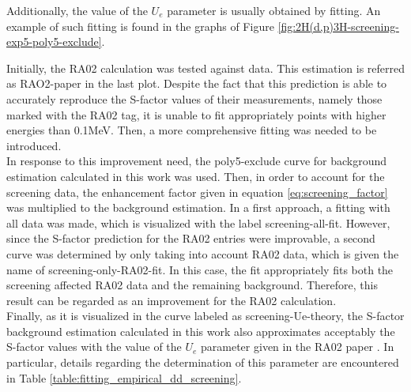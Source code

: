 \documentclass[openany]{book}
\begin{document}
Additionally, the value of the $U_e$ parameter is usually obtained by fitting. An example of such fitting is found in the graphs of Figure \ref{fig:2H(d,p)3H-screening-exp5-poly5-exclude}.


Initially, the RA02 calculation \cite{raiola_migliardi_gyurky_aliotta_formicola_bonetti_broggini_campajola_corvisiero_costantini_et_2002} was tested against data. This estimation is referred as RAO2-paper in the last plot. Despite the fact that this prediction is able to accurately reproduce the S-factor values of their measurements, namely those marked with the RA02 tag, it is unable to fit appropriately points with higher energies than 0.1MeV. Then, a more comprehensive fitting was needed to be introduced. \\

In response to this improvement need, the poly5-exclude curve for background estimation calculated in this work was used. Then, in order to account for the screening data, the enhancement factor given in equation \ref{eq:screening_factor} was multiplied to the background estimation. In a first approach, a fitting with all data was made, which is visualized with the label screening-all-fit. However, since the S-factor prediction for the RA02 entries were improvable, a second curve was determined by only taking into account RA02 data, which is given the name of screening-only-RA02-fit. In this case, the fit appropriately fits both the screening affected RA02 data and the remaining  background. Therefore, this result can be regarded as an improvement for the RA02 calculation. \\

Finally, as it is visualized in the curve labeled as screening-Ue-theory, the S-factor background estimation calculated in this work also approximates acceptably the S-factor values with the value of the $U_e$ parameter given in the RA02 paper \cite{raiola_migliardi_gyurky_aliotta_formicola_bonetti_broggini_campajola_corvisiero_costantini_et_2002}. In particular, details regarding the determination of this parameter are encountered in Table \ref{table:fitting_empirical_dd_screening}. \\
\end{document}
